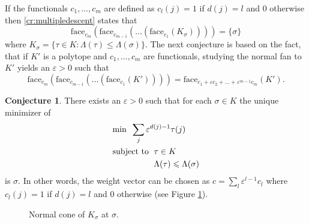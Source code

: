 \documentclass{article}
\theoremstyle{definition}
\newtheorem{conjecture}[theorem]{Conjecture}
\theoremstyle{remark}
\renewcommand{\leq}{\leqslant}
\renewcommand{\epsilon}{\varepsilon}
\newcommand{\face}{\text{face}}
\begin{document}
If the functionals $c_1,\dots,c_m$ are defined as $c_l(j)=1$ if $d(j)=l$ and $0$ otherwise then \ref{cr:multipledescent} states that
$$ \face_{c_m}\left(\face_{c_{m-1}}\left(\dots \left(\face_{c_1}\left(K_\sigma\right)\right)\right)\right) = \{\sigma\}$$
where $K_\sigma = \{\tau\in K : \Lambda(\tau)\leq\Lambda(\sigma)\}$.
The next conjecture is based on the fact, that if $K'$ is a polytope and $c_1,\dots,c_m$ are functionals, studying the normal fan to $K'$ yields an $\epsilon>0$ such that 
$$ \face_{c_m}\left(\face_{c_{m-1}}\left(\dots \left(\face_{c_1}\left(K'\right)\right)\right)\right) = \face_{c_1+\epsilon c_2 + \dots + \epsilon^{m-1}c_m}\left(K'\right).$$
\begin{conjecture}\label{cj:normalfan}
There exists an $\epsilon > 0$ such that for each $\sigma\in K$ the unique minimizer of 
\begin{align*}
&\textup{min}\;\; \sum_{j}\epsilon^{d(j)-1}\tau(j) \\
&\textup{subject to }\; \tau \in K \\
&\phantom{\textup{subject to }\;} \Lambda(\tau) \leq \Lambda(\sigma)
\end{align*}
is $\sigma$.
In other words, the weight vector can be chosen as $c = \sum_{l}\epsilon^{l-1} c_l$ where $c_l(j)=1$ if $d(j)=l$ and $0$ otherwise (see Figure \ref{fig:normalcone}).
\end{conjecture}

\begin{figure}[H]
\centering
{}
\caption{Normal cone of $K_\sigma$ at $\sigma$.}
\label{fig:normalcone}
\end{figure}
\end{document}
